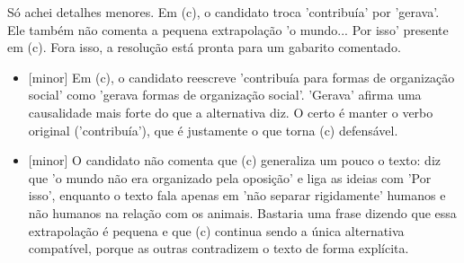 \documentclass{article}%
\begin{document}
\newline%
Só achei detalhes menores. Em (c), o candidato troca 'contribuía' por 'gerava'. Ele também não comenta a pequena extrapolação 'o mundo... Por isso' presente em (c). Fora isso, a resolução está pronta para um gabarito comentado.%
\begin{itemize}%
\item%
{[}minor{]} Em (c), o candidato reescreve 'contribuía para formas de organização social' como 'gerava formas de organização social'. 'Gerava' afirma uma causalidade mais forte do que a alternativa diz. O certo é manter o verbo original ('contribuía'), que é justamente o que torna (c) defensável.%
\item%
{[}minor{]} O candidato não comenta que (c) generaliza um pouco o texto: diz que 'o mundo não era organizado pela oposição' e liga as ideias com 'Por isso', enquanto o texto fala apenas em 'não separar rigidamente' humanos e não humanos na relação com os animais. Bastaria uma frase dizendo que essa extrapolação é pequena e que (c) continua sendo a única alternativa compatível, porque as outras contradizem o texto de forma explícita.%
\end{itemize}%
\end{document}
